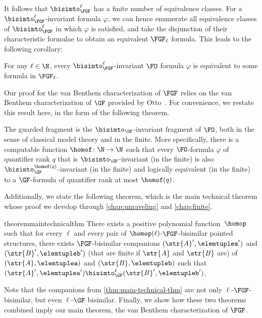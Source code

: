 It follows that $\bisimto_{\FGF}^{\ell}$ has a finite number of equivalence classes.
For a $\bisimto_{\FGF}^{\ell}$-invariant formula $\varphi$, we can hence enumerate all equivalence classes of $\bisimto_{\FGF}^{\ell}$ in which $\varphi$ is satisfied, and take the disjunction of their characteristic formulae to obtain an equivalent $\FGF_{\ell}$ formula.
This leads to the following corollary:
\begin{corollary}\label{cor:ell-invariant-has-ell-formula}
  For any $\ell \in \N$, every $\bisimto_{\FGF}^{\ell}$-invariant $\FO$ formula $\varphi$ is equivalent to some formula in $\FGF_{\ell}$.
\end{corollary}

\noindent
Our proof for the van Benthem characterization of $\FGF$ relies on the van Benthem characterization of $\GF$ provided by Otto~\cite{Otto2012}.
For convenience, we restate this result here, in the form of the following theorem.
\begin{theorem}\label{thm:vanBenthem-for-GF}
  The guarded fragment is the $\bisimto_{\GF}$-invariant fragment of $\FO$, both in the sense of classical model theory and in the finite.
  More specifically, there is a computable function $\homof \colon \N \to \N$ such that every $\FO$-formula $\varphi$ of quantifier rank $q$ that is $\bisimto_{\GF}$-invariant (in the finite) is also $\bisimto^{\homof(q)}_{\GF}$-invariant (in the finite) and logically equivalent (in the finite) to a $\GF$-formula of quantifier rank at most $\homof(q)$.
\end{theorem}
Additionally, we state the following theorem, which is the main technical theorem whose proof we develop through \cref{chap:unraveling} and \cref{chap:finite}.
\begin{restatable*}{theorem}{maintechnicalthm}\label{thm:main-technical-thm}
  There exists a positive polynomial function~$\homop$ such that for every $\ell$ and every pair of $\homop(\ell)$-$\FGF$-bisimilar pointed structures, there exists $\FGF$-bisimilar companions $(\str{A}', \elemtuplea')$ and $(\str{B}', \elemtupleb')$ (that are finite if $\str{A}$ and $\str{B}$ are) of $(\str{A}, \elemtuplea)$ and $(\str{B}, \elemtupleb)$ such that $(\str{A}', \elemtuplea') \bisimto^{\ell}_{\GF} (\str{B}', \elemtupleb')$.
\end{restatable*}

\noindent
Note that the companions from \cref{thm:main-technical-thm} are not only $\ell$-$\FGF$-bisimilar, but even $\ell$-$\GF$ bisimilar. Finally, we show how these two theorems combined imply our main theorem, the van Benthem characterization of $\FGF$.

